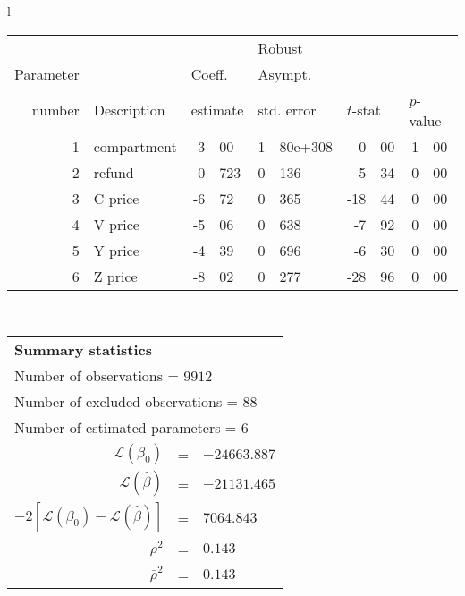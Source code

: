   \begin{tabular}{l}
\begin{tabular}{rlr@{.}lr@{.}lr@{.}lr@{.}l}
         &                       &   \multicolumn{2}{l}{}    & \multicolumn{2}{l}{Robust}  &     \multicolumn{4}{l}{}   \\
Parameter &                       &   \multicolumn{2}{l}{Coeff.}      & \multicolumn{2}{l}{Asympt.}  &     \multicolumn{4}{l}{}   \\
number &  Description                     &   \multicolumn{2}{l}{estimate}      & \multicolumn{2}{l}{std. error}  &   \multicolumn{2}{l}{$t$-stat}  &   \multicolumn{2}{l}{$p$-value}   \\

\hline

1 & compartment & 3&00 & 1&80e+308 & 0&00 & 1&00\\
2 & refund & -0&723 & 0&136 & -5&34 & 0&00\\
3 & C price & -6&72 & 0&365 & -18&44 & 0&00\\
4 & V price & -5&06 & 0&638 & -7&92 & 0&00\\
5 & Y price & -4&39 & 0&696 & -6&30 & 0&00\\
6 & Z price & -8&02 & 0&277 & -28&96 & 0&00\\
\hline
\end{tabular}
\\
\begin{tabular}{rcl}
\multicolumn{3}{l}{\bf Summary statistics}\\
\multicolumn{3}{l}{ Number of observations = $9912$} \\
\multicolumn{3}{l}{ Number of excluded observations = $88$} \\
\multicolumn{3}{l}{ Number of estimated  parameters = $6$} \\
 $\mathcal{L}(\beta_0)$ &=&  $-24663.887$ \\
 $\mathcal{L}(\hat{\beta})$ &=& $-21131.465 $  \\
 $-2[\mathcal{L}(\beta_0) -\mathcal{L}(\hat{\beta})]$ &=& $7064.843$ \\
    $\rho^2$ &=&   $0.143$ \\
    $\bar{\rho}^2$ &=&    $0.143$ \\
\end{tabular}
  \end{tabular}
